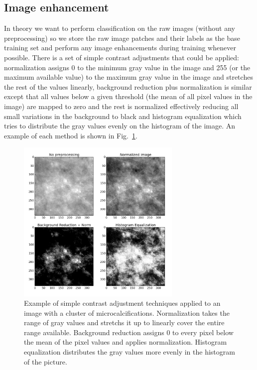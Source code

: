 \subsection{Image enhancement}
In theory we want to perform classification on the raw images (without any preprocessing) so we store the raw image patches and their labels as the base training set and perform any image enhancements during training whenever possible. There is a set of simple contrast adjustments that could be applied: normalization assigns 0 to the minimum gray value in the image and 255 (or the maximum available value) to the maximum gray value in the image and stretches the rest of the values linearly, background reduction plus normalization is similar except that all values below a given threshold (the mean of all pixel values in the image) are mapped to zero and the rest is normalized effectively reducing all small variations in the background to black and histogram equalization which tries to distribute the gray values evenly on the histogram of the image. An example of each method is shown in Fig.~\ref{fig:PreprocessingTechniques}.
\begin{figure}[h!]
	\centering
	\includegraphics [width = 0.7\textwidth]{plots/mcDiffPreprocessings.png}
	\caption[Example of constrast adjustment techniques]{Example of simple contrast adjustment techniques applied to an image with a cluster of microcalcifications. Normalization takes the range of gray values and stretchs it up to linearly cover the entire range available. Background reduction assigns 0 to every pixel below the mean of the pixel values and applies normalization. Histogram equalization distributes the gray values more evenly in the histogram of the picture.}
	\label{fig:PreprocessingTechniques}
\end{figure}

